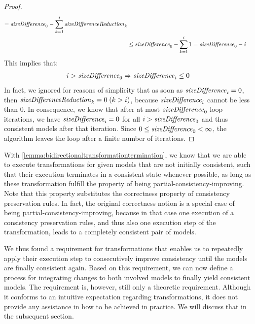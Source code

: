 \begin{proof}
\begin{align*}
        =  \mathit{sizeDifference}_{0} - \sum_{k=1}^{i} \mathit{sizeDifferenceReduction}_{k} \\
        &
        \leq \mathit{sizeDifference}_{0} - \sum_{k=1}^{i} 1 = \mathit{sizeDifference}_{0} - i
    \end{align*}
    This implies that:
    \begin{align*}
        i > \mathit{sizeDifference}_{0} \Rightarrow \mathit{sizeDifference}_{i} \leq 0
    \end{align*}
    In fact, we ignored for reasons of simplicity that as soon as $\mathit{sizeDifference}_{i} = 0$, then $\mathit{sizeDifferenceReduction}_{k} = 0\; (k > i)$, because $\mathit{sizeDifference}_{i}$ cannot be less than $0$.
    In consequence, we know that after at most $\mathit{sizeDifference}_{0}$ loop iterations, we have $\mathit{sizeDifference}_{i} = 0$ for all $i > \mathit{sizeDifference}_{0}$ and thus consistent models after that iteration.
    Since $0 \leq \mathit{sizeDifference}_{0} < \infty$, the algorithm leaves the loop after a finite number of iterations.
\end{proof}

With \autoref{lemma:bidirectionaltransformationtermination}, we know that we are able to execute transformations for given models that are not initially consistent, such that their execution terminates in a consistent state whenever possible, as long as these transformation fulfill the property of being partial-consistency-improving.
Note that this property substitutes the correctness property of consistency preservation rules.
In fact, the original correctness notion is a special case of being partial-consistency-improving, because in that case one execution of a consistency preservation rules, and thus also one execution step of the transformation, leads to a completely consistent pair of models.

We thus found a requirement for transformations that enables us to repeatedly apply their execution step to consecutively improve consistency until the models are finally consistent again.
Based on this requirement, we can now define a process for integrating changes to both involved models to finally yield consistent models.
The requirement is, however, still only a theoretic requirement. 
Although it conforms to an intuitive expectation regarding transformations, it does not provide any assistance in how to be achieved in practice. We will discuss that in the subsequent section.

